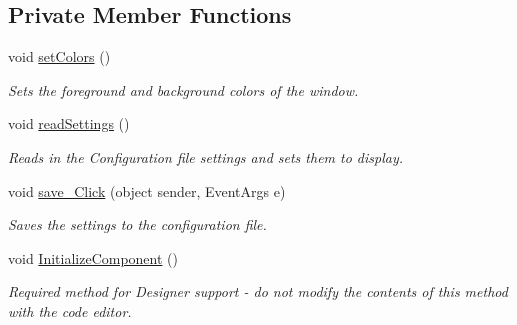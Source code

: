 \subsection*{Private Member Functions}
\begin{DoxyCompactItemize}
\item 
void \mbox{\hyperlink{class_cert_complete_1_1_innowi___settings___form_aeb45fff5005ef31545cab12e82adabe6}{set\+Colors}} ()
\begin{DoxyCompactList}\small\item\em Sets the foreground and background colors of the window. \end{DoxyCompactList}\item 
void \mbox{\hyperlink{class_cert_complete_1_1_innowi___settings___form_aafde21ba0d2e2bbb5195e85c991cd3cb}{read\+Settings}} ()
\begin{DoxyCompactList}\small\item\em Reads in the Configuration file settings and sets them to display. \end{DoxyCompactList}\item 
void \mbox{\hyperlink{class_cert_complete_1_1_innowi___settings___form_a198c1100e7b9a3664c477d7d14745374}{save\+\_\+\+Click}} (object sender, Event\+Args e)
\begin{DoxyCompactList}\small\item\em Saves the settings to the configuration file. \end{DoxyCompactList}\item 
void \mbox{\hyperlink{class_cert_complete_1_1_innowi___settings___form_a7685d0252eef89c2ab31fb660aaa40b1}{Initialize\+Component}} ()
\begin{DoxyCompactList}\small\item\em Required method for Designer support -\/ do not modify the contents of this method with the code editor. \end{DoxyCompactList}\end{DoxyCompactItemize}
